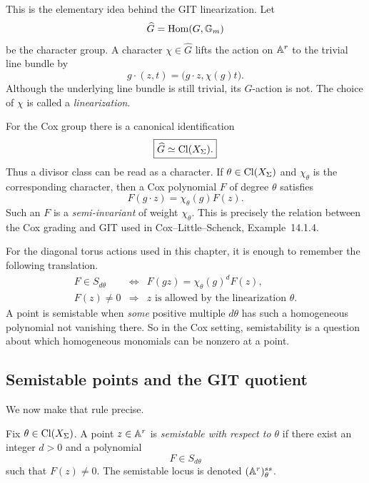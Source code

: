 This is the elementary idea behind the GIT linearization.  Let
\[
\widehat G=\operatorname{Hom}(G,\mathbb{G}_{m})
\]
be the character group.  A character \(\chi\in\widehat G\) lifts the
action on \(\mathbb{A}^r\) to the trivial line bundle by
\[
g\cdot(z,t)=\bigl(g\cdot z,\chi(g)t\bigr).
\]
Although the underlying line bundle is still trivial, its \(G\)-action
is not.  The choice of \(\chi\) is called a \emph{linearization}.

For the Cox group there is a canonical identification
\[
\boxed{
\widehat G\simeq\operatorname{Cl}(X_\Sigma).}
\]
Thus a divisor class can be read as a character.  If
\(\theta\in\operatorname{Cl}(X_\Sigma)\) and \(\chi_\theta\) is the corresponding
character, then a Cox polynomial \(F\) of degree \(\theta\) satisfies
\[
F(g\cdot z)=\chi_\theta(g)F(z).
\]
Such an \(F\) is a \emph{semi-invariant} of weight \(\chi_\theta\).
This is precisely the relation between the Cox grading and GIT used in
Cox--Little--Schenck, Example~14.1.4.

\begin{agcheatsheet}
For the diagonal torus actions used in this chapter, it is enough to
remember the following translation.
\[
\begin{array}{ccl}
F\in S_{d\theta}
&\Longleftrightarrow&
F(gz)=\chi_\theta(g)^dF(z),
\\[1mm]
F(z)\neq0
&\Longrightarrow&
z\text{ is allowed by the linearization }\theta.
\end{array}
\]
A point is semistable when \emph{some} positive multiple \(d\theta\)
has such a homogeneous polynomial not vanishing there.  So in the Cox
setting, semistability is a question about which homogeneous monomials
can be nonzero at a point.
\end{agcheatsheet}

\subsection{Semistable points and the GIT quotient}

We now make that rule precise.

\begin{definition}
\label{def:cox-git-semistable}
Fix \(\theta\in\operatorname{Cl}(X_\Sigma)\).  A point \(z\in\mathbb{A}^r\) is
\emph{semistable with respect to \(\theta\)} if there exist an integer
\(d>0\) and a polynomial
\[
F\in S_{d\theta}
\]
such that \(F(z)\neq0\).  The semistable locus is denoted
\((\mathbb{A}^r)^{ss}_\theta\).
\end{definition}

